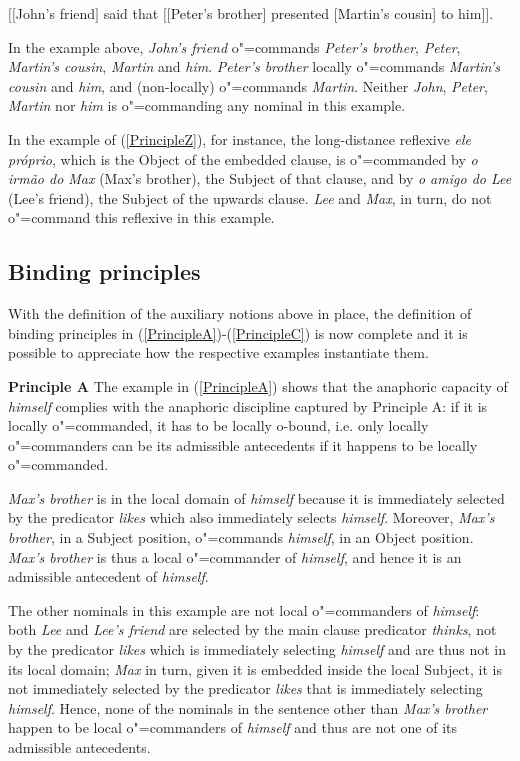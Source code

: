 \documentclass[output=paper
	        ,collection
	        ,collectionchapter
 	        ,biblatex
                ,babelshorthands
                ,newtxmath
                ,draftmode
                ,colorlinks, citecolor=brown
]{langscibook}
\begin{document}
\begin{exe}
\ex $[[$John's friend$]$ said that $[[$Peter's brother$]$ presented [Martin's cousin] to him$]]$.
\end{exe}

In the example above, {\em John's friend} o"=commands {\em Peter's brother}, {\em Peter}, 
{\em Martin's cousin}, {\em Martin} and {\em him}. 
{\em Peter's brother} locally o"=commands {\em Martin's cousin} and {\em him},
and (non-locally) o"=commands {\em Martin}. Neither {\em John}, {\em Peter}, {\em Martin} nor {\em him} is o"=commanding
any nominal in this example.

In the example of (\ref{PrincipleZ}), for instance, the  long-distance reflexive {\em ele pr\'{o}prio},
which is the Object of the embedded clause, is o"=commanded by {\em o irm\~{a}o do Max} (Max's brother),
the Subject of that clause, and by {\em o amigo do Lee} (Lee's friend), the Subject of the upwards clause.
{\em Lee} and {\em Max}, in  turn, do not o"=command this reflexive in this example.


\subsection{Binding principles}\label{principles}

With the definition of the auxiliary notions above in place, the definition 
of binding principles in (\ref{PrincipleA})-(\ref{PrincipleC}) is now complete and it is possible
to appreciate how the respective examples instantiate them.

{\bf Principle A} The example in (\ref{PrincipleA}) shows that the anaphoric capacity of {\em himself} complies with 
the anaphoric discipline captured by Principle A: if it is locally o"=commanded, it has to be locally o-bound, 
i.e. only locally o"=commanders can be its admissible antecedents if it happens to be locally o"=commanded.

{\em Max's brother} is in the local domain
of {\em himself} because it is immediately selected by the predicator {\em likes} which also
immediately selects {\em himself}. Moreover, {\em Max's brother}, in a Subject position, 
o"=commands {\em himself}, in an Object position. {\em Max's brother}
is thus a local o"=commander of {\em himself}, and hence it is an admissible antecedent
of {\em himself}. 

The other nominals in this example are not local o"=commanders of {\em himself}: both
{\em Lee} and {\em Lee's friend} are selected by the main clause predicator {\em thinks},
not by the predicator {\em likes} which is immediately selecting {\em himself} and are thus not 
in its local domain; {\em Max} in turn, given it is embedded inside the local Subject, it is not immediately selected 
by the predicator {\em likes} that is immediately selecting {\em himself}. Hence, none of
the nominals in the sentence other than {\em Max's brother} happen to be local o"=commanders of {\em himself} 
and thus are not one of its admissible antecedents.
\end{document}
